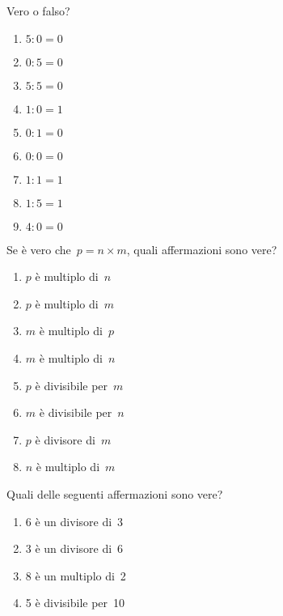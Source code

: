 \begin{esercizio}
 Vero o falso?
\begin{multicols}{3}
\begin{enumerate}[noitemsep, label=(\alph*)]
 \item \(5:0=0\)	\tab\boxV\quad\boxF
 \item \(0:5=0\)	\tab\boxV\quad\boxF
 \item \(5:5=0\)	\tab\boxV\quad\boxF
 \item \(1:0=1\)	\tab\boxV\quad\boxF
 \item \(0:1=0\)	\tab\boxV\quad\boxF
 \item \(0:0=0\)	\tab\boxV\quad\boxF
 \item \(1:1=1\)	\tab\boxV\quad\boxF
 \item \(1:5=1\)	\tab\boxV\quad\boxF
 \item \(4:0=0\)  \tab\boxV\quad\boxF
\end{enumerate}
\end{multicols}
\end{esercizio}

\begin{esercizio}
 Se è vero che~\(p=n\times m\), quali affermazioni sono vere?
\begin{multicols}{2}
\TabPositions{3.2cm}
\begin{enumerate}[noitemsep, label=(\alph*)]
 \item \(p\) è multiplo di~\(n\)	\tab\boxV\quad\boxF
 \item \(p\) è multiplo di~\(m\)	\tab\boxV\quad\boxF
 \item \(m\) è multiplo di~\(p\)	\tab\boxV\quad\boxF
 \item \(m\) è multiplo di~\(n\)	\tab\boxV\quad\boxF
 \item \(p\) è divisibile per~\(m\)	\tab\boxV\quad\boxF
 \item \(m\) è divisibile per~\(n\)	\tab\boxV\quad\boxF
 \item \(p\) è divisore di~\(m\)	\tab\boxV\quad\boxF
 \item \(n\) è multiplo di~\(m\)	\tab\boxV\quad\boxF
\end{enumerate}
\end{multicols}
\end{esercizio}

\begin{esercizio}
 Quali delle seguenti affermazioni sono vere?

\begin{multicols}{2}
\TabPositions{3.2cm}
 \begin{enumerate}[noitemsep, label=(\alph*)]
 \item 6 è un divisore di~3 \tab\boxV\quad\boxF
 \item 3 è un divisore di~6 \tab\boxV\quad\boxF
 \item 8 è un multiplo di~2 \tab\boxV\quad\boxF
 \item 5 è divisibile per~10 \tab\boxV\quad\boxF
 \end{enumerate}
\end{multicols}
\end{esercizio}

